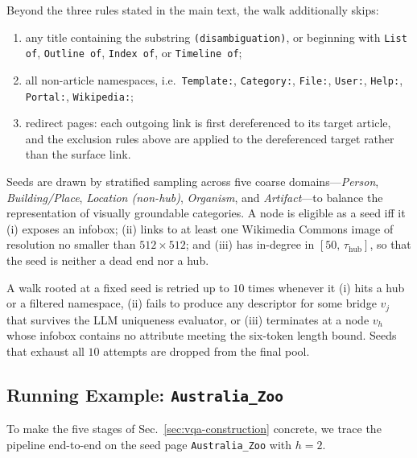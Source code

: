 Beyond the three rules stated in the main text, the walk additionally skips:
\begin{enumerate}[leftmargin=*,itemsep=1pt,topsep=1pt]
    \item any title containing the substring \texttt{(disambiguation)}, or beginning with \texttt{List of}, \texttt{Outline of}, \texttt{Index of}, or \texttt{Timeline of};
    \item all non-article namespaces, i.e.\ \texttt{Template:}, \texttt{Category:}, \texttt{File:}, \texttt{User:}, \texttt{Help:}, \texttt{Portal:}, \texttt{Wikipedia:};
    \item redirect pages: each outgoing link is first dereferenced to its target article, and the exclusion rules above are applied to the dereferenced target rather than the surface link.
\end{enumerate}


Seeds are drawn by stratified sampling across five coarse domains---\emph{Person}, \emph{Building/Place}, \emph{Location (non-hub)}, \emph{Organism}, and \emph{Artifact}---to balance the representation of visually groundable categories. A node is eligible as a seed iff it (i) exposes an infobox; (ii) links to at least one Wikimedia Commons image of resolution no smaller than $512\times 512$; and (iii) has in-degree in $[50,\,\tau_\text{hub}]$, so that the seed is neither a dead end nor a hub.


A walk rooted at a fixed seed is retried up to $10$ times whenever it (i) hits a hub or a filtered namespace, (ii) fails to produce any descriptor for some bridge $v_j$ that survives the LLM uniqueness evaluator, or (iii) terminates at a node $v_h$ whose infobox contains no attribute meeting the six-token length bound. Seeds that exhaust all $10$ attempts are dropped from the final pool.

\subsection{Running Example: \texttt{Australia\_Zoo}}
\label{apdx:vqa-running-example}

To make the five stages of Sec.~\ref{sec:vqa-construction} concrete, we trace the pipeline end-to-end on the seed page \texttt{Australia\_Zoo} with $h=2$.


